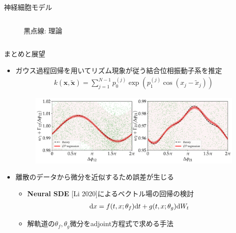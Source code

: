 \begin{frame}{神経細胞モデル}
\begin{columns}[t]
\begin{column}{0.5\textwidth}
\begin{figure}
        \caption*{黒点線: 理論\ }
      \end{figure}
    \end{column}
  \end{columns}
\end{frame}

\begin{frame}{まとめと展望}
  \begin{itemize}
    \item ガウス過程回帰を用いてリズム現象が従う結合位相振動子系を推定
    \begin{align*}
      k(\bm{x},\tilde{\bm{x}})=\sum_{j=1}^{N-1}p_{0}^{(j)}\exp(p_{1}^{(j)}\cos(x_{j}-\tilde{x}_{j}))
    \end{align*}
    \begin{figure}
      \includegraphics[height=0.3\textheight]{figs/exp01case01.pdf}
    \end{figure}
    \item 離散のデータから微分を近似するため誤差が生じる
    \begin{itemize}
      \item \textbf{Neural SDE} [Li 2020]によるベクトル場の回帰の検討 %
      \begin{align*}
        \mathrm{d} x=f(t,x;\theta_{f})\mathrm{d} t+g(t,x;\theta_{g})\mathrm{d} W_{t}
      \end{align*}
      \item 解軌道の$\theta_{f},\theta_{g}$微分をadjoint方程式で求める手法
    \end{itemize}
  \end{itemize}
\end{frame}